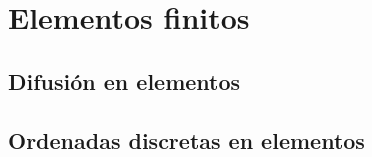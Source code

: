\section{Elementos finitos} %
\label{sec:elementos}

{\color{red}\lipsum[8]}

\subsection{Difusión en elementos} %

{\color{red}\lipsum[9]}

\subsection{Ordenadas discretas en elementos} %

{\color{red}\lipsum[10]}
